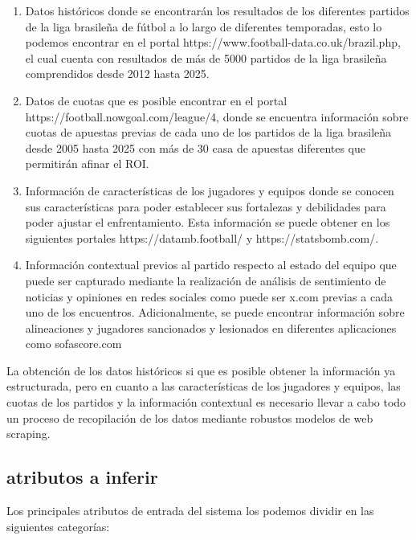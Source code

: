 \begin{enumerate}
    \item Datos históricos donde se encontrarán los resultados de los diferentes partidos de la liga brasileña de fútbol a lo largo de diferentes temporadas, esto lo podemos encontrar en el portal  https://www.football-data.co.uk/brazil.php, el cual cuenta con resultados de más de 5000 partidos de la liga brasileña comprendidos desde 2012 hasta 2025.
    \item Datos de cuotas que es posible encontrar en el portal https://football.nowgoal.com/league/4, donde se encuentra información sobre cuotas de apuestas previas de cada uno de los partidos de la liga brasileña desde 2005 hasta 2025 con más de 30 casa de apuestas diferentes que permitirán afinar el ROI.
    \item Información de características de los jugadores y equipos donde se conocen sus características para poder establecer sus fortalezas y debilidades para poder ajustar el enfrentamiento. Esta información se puede obtener en los siguientes portales https://datamb.football/ y  https://statsbomb.com/.  
    \item Información contextual previos al partido respecto al estado del equipo que puede ser capturado mediante la realización de análisis de sentimiento de noticias y opiniones en redes sociales como puede ser x.com previas a cada uno de los encuentros. Adicionalmente, se puede encontrar información sobre alineaciones y jugadores sancionados y lesionados en diferentes aplicaciones como sofascore.com
\end{enumerate}

La obtención de los datos históricos si que es posible obtener la información ya estructurada, pero en cuanto a las características de los jugadores y equipos, las cuotas de los partidos y la información contextual es necesario llevar a cabo todo un proceso de recopilación de los datos mediante robustos modelos de web scraping.

\subsection{atributos a inferir}

Los principales atributos de entrada del sistema los podemos dividir en las siguientes categorías:

